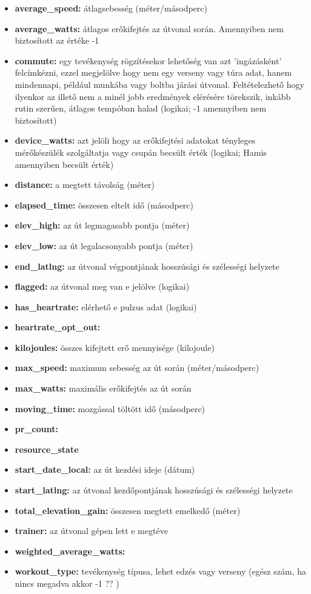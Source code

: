 \begin{itemize}
	\item \textbf{average\_speed:} átlagsebesség (méter/másodperc)
	\item \textbf{average\_watts:} átlagos erőkifejtés az útvonal során. Amennyiben nem biztosított az értéke -1
	\item \textbf{commute:} egy tevékenység rögzítésekor lehetőség van azt 'ingázásként' felcímkézni, ezzel megjelölve hogy nem egy verseny vagy túra adat, hanem mindennapi, például munkába vagy boltba járási útvonal. Feltételezhető hogy ilyenkor az illető nem a minél jobb eredmények elérésére törekszik, inkább rutin szerűen, átlagos tempóban halad (logikai; -1 amennyiben nem biztosított)
	\item \textbf{device\_watts:} azt jelöli hogy az erőkifejtési adatokat tényleges mérőkészülék szolgáltatja vagy csupán becsült érték (logikai; Hamis amennyiben becsült érték) 
	\item \textbf{distance:} a megtett távolság (méter)
	\item \textbf{elapsed\_time:} összesen eltelt idő (másodperc)
	\item \textbf{elev\_high:} az út legmagasabb pontja (méter)
	\item \textbf{elev\_low:} az út legalacsonyabb pontja (méter)
	\item \textbf{end\_latlng:} az útvonal végpontjának hosszúsági és szélességi helyzete
	\item \textbf{flagged:} az útvonal meg van e jelölve (logikai)
	\item \textbf{has\_heartrate:} elérhető e pulzus adat (logikai)
	\item \textbf{heartrate\_opt\_out:} 
	\item \textbf{kilojoules:} összes kifejtett erő mennyisége (kilojoule)
	\item \textbf{max\_speed:} maximum sebesség az út során (méter/másodperc)
	\item \textbf{max\_watts:} maximális erőkifejtés az út során
	\item \textbf{moving\_time:} mozgással töltött idő (másodperc)
	\item \textbf{pr\_count:}
	\item \textbf{resource\_state}
	\item \textbf{start\_date\_local:} az út kezdési ideje (dátum)
	\item \textbf{start\_latlng:} az útvonal kezdőpontjának hosszúsági és szélességi helyzete
	\item \textbf{total\_elevation\_gain:} összesen megtett emelkedő (méter)
	\item \textbf{trainer:} az útvonal gépen lett e megtéve
	\item \textbf{weighted\_average\_watts:}
	\item \textbf{workout\_type:} tevékenység típusa, lehet edzés vagy verseny (egész szám, ha nincs megadva akkor -1 ?? )
\end{itemize}










